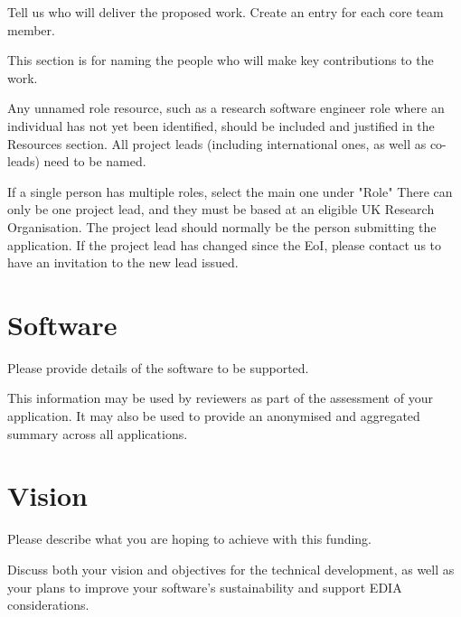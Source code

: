 \documentclass[12pt]{article}
\newenvironment{instruction}{%
    \begin{tcolorbox}[colback=red!5,colframe=red,title=Instruction]%
}{%
    \end{tcolorbox}%
}
\begin{document}
\begin{instruction}

Tell us who will deliver the proposed work. Create an entry for each core team member.

This section is for naming the people who will make key contributions to the work.

Any unnamed role resource, such as a research software engineer role where an individual has not yet been identified, should be included and justified in the Resources section. All project leads (including international ones, as well as co-leads) need to be named.

If a single person has multiple roles, select the main one under "Role"
There can only be one project lead, and they must be based at an eligible UK Research Organisation. The project lead should normally be the person submitting the application.
If the project lead has changed since the EoI, please contact us to have an invitation to the new lead issued.

\end{instruction}

\pagebreak

\section{Software}

\begin{instruction}

Please provide details of the software to be supported.

This information may be used by reviewers as part of the assessment of your application. It may also be used to provide an anonymised and aggregated summary across all applications.

\end{instruction}



\pagebreak

\section{Vision}

\begin{instruction}

Please describe what you are hoping to achieve with this funding.

Discuss both your vision and objectives for the technical development, as well as your plans to improve your software's sustainability and support EDIA considerations.

\end{instruction}
\end{document}
